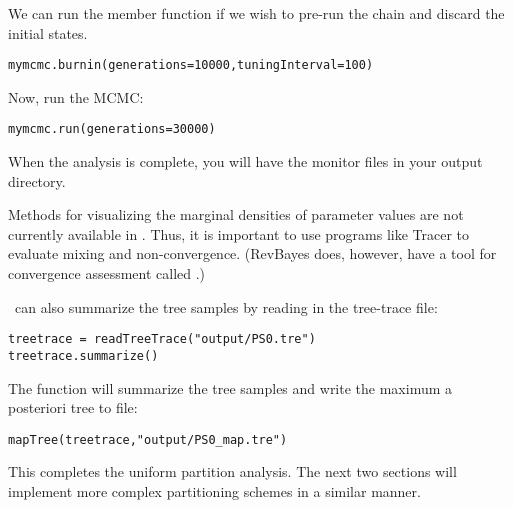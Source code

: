 We can run the  member function if we wish to pre-run the chain and discard the initial states. 
{\tt \begin{snugshade*}
\begin{lstlisting}
mymcmc.burnin(generations=10000,tuningInterval=100)
\end{lstlisting}
\end{snugshade*}}


Now, run the MCMC:
{\tt \begin{snugshade*}
\begin{lstlisting}
mymcmc.run(generations=30000)
\end{lstlisting}
\end{snugshade*}}

When the analysis is complete, you will have the monitor files in your output directory.

Methods for visualizing the marginal densities of parameter values are not currently available in \RevBayes. Thus, it is important to use programs like Tracer \citep{Rambaut2009} to evaluate mixing and non-convergence. (RevBayes does, however, have a tool for convergence assessment called .)

\RevBayes~can also summarize the tree samples by reading in the tree-trace file:
{\tt \begin{snugshade*}
\begin{lstlisting}
treetrace = readTreeTrace("output/PS0.tre")
treetrace.summarize()
\end{lstlisting}
\end{snugshade*}}


The  function will summarize the tree samples and write the maximum a posteriori tree to file:
{\tt \begin{snugshade*}
\begin{lstlisting}
mapTree(treetrace,"output/PS0_map.tre")
\end{lstlisting}
\end{snugshade*}}

This completes the uniform partition analysis.
The next two sections will implement more complex partitioning schemes in a similar manner.
